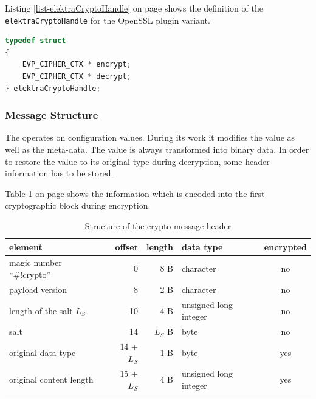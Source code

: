 Listing \ref{list-elektraCryptoHandle} on page \pageref{list-elektraCryptoHandle} shows the definition of the \texttt{elektraCryptoHandle} for the OpenSSL plugin variant.

\begin{lstlisting}[label=list-elektraCryptoHandle,language=C,caption={Definiton of elektraCryptoHandle for the OpenSSL crypto plugin variant}]
typedef struct
{
	EVP_CIPHER_CTX * encrypt;
	EVP_CIPHER_CTX * decrypt;
} elektraCryptoHandle;
\end{lstlisting}


\subsubsection{Message Structure}
\label{impl-msgstruct}

The \crypto{} operates on configuration values.
During its work it modifies the value as well as the meta-data.
The value is always transformed into binary data.
In order to restore the value to its original type during decryption, some header information has to be stored.

Table \ref{impl-msgheader} on page \pageref{impl-msgheader} shows the information which is encoded into the first cryptographic block during encryption.

\begin{table}[h]
\centering
\caption{Structure of the crypto message header}
\label{impl-msgheader}
\begin{tabular}{lrrlc}
	\textbf{element}           & \textbf{offset} & \textbf{length} & \textbf{data type}    & \textbf{encrypted} \\ \hline
	magic number ``\#!crypto'' & 0               & 8 B             & character             & no                 \\
	payload version            & 8               & 2 B             & character             & no                 \\
	length of the salt $L_S$   & 10              & 4 B             & unsigned long integer & no                 \\
	salt                       & 14              & $L_S$ B         & byte                  & no                 \\
	original data type         & 14 + $L_S$      & 1 B             & byte                  & yes                \\
	original content length    & 15 + $L_S$      & 4 B             & unsigned long integer & yes                \\ \hline
\end{tabular}
\end{table}

